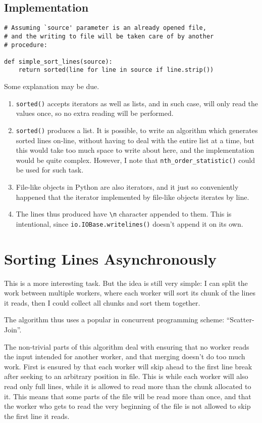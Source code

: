 \documentclass[11pt]{article}
\begin{document}
\subsection{Implementation}
\label{sec-1-2}

\lstset{language=Python,label= ,caption= ,numbers=none}
\begin{lstlisting}
# Assuming `source' parameter is an already opened file,
# and the writing to file will be taken care of by another
# procedure:

def simple_sort_lines(source):
    return sorted(line for line in source if line.strip())
\end{lstlisting}

Some explanation may be due.

\begin{enumerate}
\item \verb~sorted()~ accepts iterators as well as lists, and in such case, will only
read the values once, so no extra reading will be performed.
\item \verb~sorted()~ produces a list.  It is possible, to write an algorithm which
generates sorted lines on-line, without having to deal with the entire
list at a time, but this would take too much space to write about here,
and the implementation would be quite complex.  However, I note that
\verb~nth_order_statistic()~ could be used for such task.
\item File-like objects in Python are also iterators, and it just so
conveniently happened that the iterator implemented by file-like objects
iterates by line.
\item The lines thus produced have \verb~\n~ character appended to them.  This is
intentional, since \verb~io.IOBase.writelines()~ doesn't append it on its own.
\end{enumerate}

\section{Sorting Lines Asynchronously}
\label{sec-2}
This is a more interesting task.  But the idea is still very simple:  I can
split the work between multiple workers, where each worker will sort its
chunk of the lines it reads, then I could collect all chunks and sort them
together.

The algorithm thus uses a popular in concurrent programming scheme:
``Scatter-Join''.

The non-trivial parts of this algorithm deal with ensuring that no worker
reads the input intended for another worker, and that merging doesn't do too
much work.  First is ensured by that each worker will skip ahead to the first
line break after seeking to an arbitrary position in file.  This is while each
worker will also read only full lines, while it is allowed to read more than
the chunk allocated to it.  This means that some parts of the file will be
read more than once, and that the worker who gets to read the very beginning
of the file is not allowed to skip the first line it reads.
\end{document}
